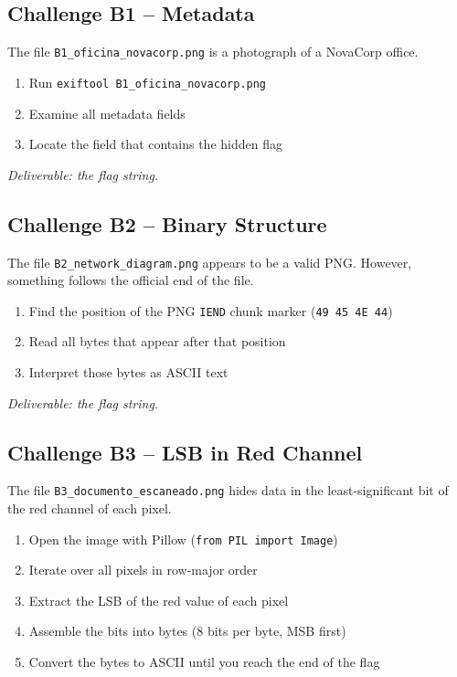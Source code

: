 \documentclass[a4paper, 12pt]{article}
\begin{document}
\subsection{Challenge B1 -- Metadata}

The file \texttt{B1\_oficina\_novacorp.png} is a photograph of a NovaCorp office.

\begin{enumerate}[leftmargin=2em]
  \item Run \texttt{exiftool B1\_oficina\_novacorp.png}
  \item Examine all metadata fields
  \item Locate the field that contains the hidden flag
\end{enumerate}

\textit{Deliverable: the flag string.}

\subsection{Challenge B2 -- Binary Structure}

The file \texttt{B2\_network\_diagram.png} appears to be a valid PNG.
However, something follows the official end of the file.

\begin{enumerate}[leftmargin=2em]
  \item Find the position of the PNG \texttt{IEND} chunk marker (\texttt{49 45 4E 44})
  \item Read all bytes that appear after that position
  \item Interpret those bytes as ASCII text
\end{enumerate}

\textit{Deliverable: the flag string.}

\subsection{Challenge B3 -- LSB in Red Channel}

The file \texttt{B3\_documento\_escaneado.png} hides data in the
least-significant bit of the red channel of each pixel.

\begin{enumerate}[leftmargin=2em]
  \item Open the image with Pillow (\texttt{from PIL import Image})
  \item Iterate over all pixels in row-major order
  \item Extract the LSB of the red value of each pixel
  \item Assemble the bits into bytes (8 bits per byte, MSB first)
  \item Convert the bytes to ASCII until you reach the end of the flag
\end{enumerate}
\end{document}
